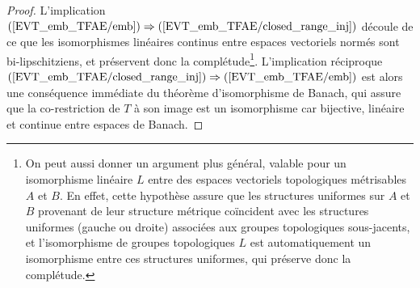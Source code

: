 \documentclass[a4paper,12pt]{article}
\renewcommand{\implies}{\Rightarrow}
\begin{document}
\begin{proof} 
    L'implication $(\ref{EVT_emb_TFAE/emb}) \implies(\ref{EVT_emb_TFAE/closed_range_inj})$ découle de ce que les isomorphismes linéaires 
    continus entre espaces vectoriels normés sont bi-lipschitziens, et préservent donc la complétude\footnote{On peut aussi donner un argument plus général, 
    valable pour un isomorphisme linéaire $L$ entre des espaces vectoriels topologiques métrisables $A$ et $B$. En effet, cette hypothèse assure
    que les structures uniformes sur $A$ et $B$ provenant de leur structure métrique coïncident avec les 
    structures uniformes (gauche ou droite) associées aux groupes topologiques sous-jacents, et l'isomorphisme de groupes 
    topologiques $L$ est automatiquement un isomorphisme entre ces structures uniformes, qui préserve donc la complétude.}.
    L'implication réciproque $(\ref{EVT_emb_TFAE/closed_range_inj}) \implies(\ref{EVT_emb_TFAE/emb})$ est alors une conséquence immédiate du
    théorème d'isomorphisme de Banach, qui assure que la co-restriction de $T$ à son image est un isomorphisme 
    car bijective, linéaire et continue entre espaces de Banach.


\end{proof}
\end{document}
